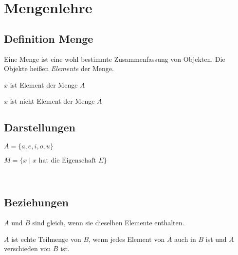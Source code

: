 \section{Mengenlehre}

\subsection{Definition Menge}

Eine Menge ist eine wohl bestimmte Zusammenfassung von Objekten.
Die Objekte heißen \emph{Elemente} der Menge.

\begin{description}[style=nextline]
	\item[\( x \in A \)] \( x \) ist Element der Menge \( A \)
	\item[\( x \notin A \)]  \( x \) ist nicht Element der Menge \( A \)
\end{description}

\subsection{Darstellungen}

\begin{description}[style=nextline]
	\item[Aufzählung]
	      \( A = \{ a, e, i, o, u \} \)
	\item[Beschreibung]
	      \( M = \{ x \mid x \text{ hat die Eigenschaft } E \} \)
	\item[Mengendiagramm]
				\ \\
\end{description}

\subsection{Beziehungen}

\begin{description}[style=nextline]
	\item[\( A = B \)]
	      \( A \) und \( B \) sind gleich, wenn sie dieselben Elemente enthalten.
	\item[\( A \subset B \)]
	      \( A \) ist echte Teilmenge von \( B \), wenn jedes Element von \( A \) auch
	      in \( B \) ist und \( A \) verschieden von \( B \) ist.
\end{description}


